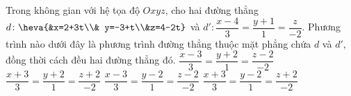 \begin{ex}%
	Trong không gian với hệ tọa độ $Oxyz$, cho hai đường thẳng $d\colon \heva{&x=2+3t\\& y=-3+t\\&z=4-2t}$ và $d'\colon \dfrac{x-4}{3}=\dfrac{y+1}{1}=\dfrac{z}{-2}$. Phương trình nào dưới đây là phương trình đường thẳng thuộc mặt phẳng chứa $d$ và $d'$, đồng thời cách đều hai đường thẳng đó.
	\choice
	{\True  $\dfrac{x-3}{3}=\dfrac{y+2}{1}=\dfrac{z-2}{-2}$}
	{$\dfrac{x+3}{3}=\dfrac{y+2}{1}=\dfrac{z+2}{-2}$}
	{$\dfrac{x-3}{3}=\dfrac{y-2}{1}=\dfrac{z-2}{-2}$}
	{$\dfrac{x+3}{3}=\dfrac{y-2}{1}=\dfrac{z+2}{-2}$}
\end{ex}

%
%
%
